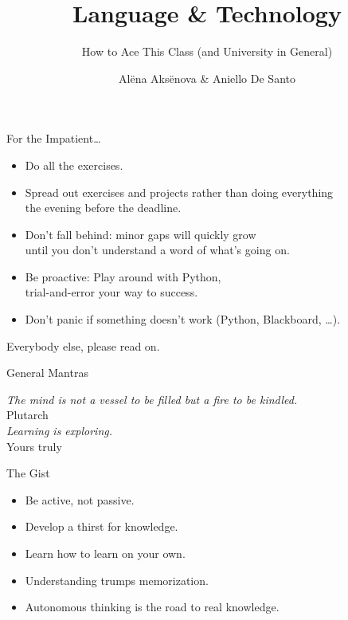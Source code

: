 \documentclass[professionalfonts, xcolor={usenames,svgnames,x11names,table}]{beamer}
\title{\texorpdfstring{Language \& Technology}{Language and Technology}}
\subtitle{How to Ace This Class (and University in General)}
\author{Al{\"e}na Aks{\"e}nova \& Aniello De Santo}
\institute{Stony Brook University\\\texttt{\{alena.aksenova,aniello.desanto\}@stonybrook.edu}}
\date{}
\begin{document}
\unnumbered{
\begin{frame}
	\titlepage
\end{frame}
}

\begin{frame}{For the Impatient\ldots}
    \begin{itemize}
        \item Do all the exercises.
        \item Spread out exercises and projects rather than doing everything\\
            the evening before the deadline.
        \item Don't fall behind: minor gaps will quickly grow\\
            until you don't understand a word of what's going on.
        \item Be proactive: Play around with Python,\\
            trial-and-error your way to success.
        \item Don't panic if something doesn't work (Python, Blackboard, \ldots).
    \end{itemize}

    Everybody else, please read on.
\end{frame}

\begin{frame}{General Mantras}
    \begin{flushright}
        \begin{minipage}[b]{28em}
            \flushright
            \emph{The mind is not a vessel to be filled but a fire to be kindled.}\\
            Plutarch\\

            \medskip
            \emph{Learning is exploring.}\\
            Yours truly
        \end{minipage}
    \end{flushright}

    \begin{block}{The Gist}
        \begin{itemize}
            \item Be active, not passive.
            \item Develop a thirst for knowledge.
            \item Learn how to learn on your own.
            \item Understanding trumps memorization.
            \item Autonomous thinking is the road to real knowledge.
        \end{itemize}
    \end{block}
\end{frame}
\end{document}
